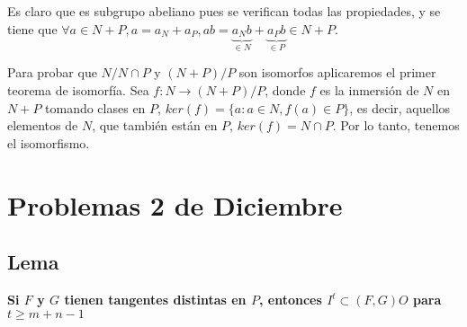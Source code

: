 Es claro que es subgrupo abeliano pues se verifican todas las propiedades, y se tiene que $\forall a \in N+P, a=a_N+a_P, ab = \underbrace{a_Nb}_{\in N}+\underbrace{a_Pb}_{\in P} \in N+P$.

Para probar que $N/N\cap P$ y $(N+P)/P$ son isomorfos aplicaremos el primer teorema de isomorfía.
Sea $f:N \rightarrow (N+P)/P$, donde $f$ es la inmersión de $N$ en $N+P$ tomando clases en $P$, $ker(f)= \{a : a \in N, f(a) \in P \}$, es decir, aquellos elementos de $N$, que también están en $P$, $ker(f)=N\cap P$. Por lo tanto, tenemos el isomorfismo.

\newpage

\section{Problemas 2 de Diciembre}

\subsection{Lema}

\textbf{Si $F$ y $G$ tienen tangentes distintas en $P$, entonces $I^t\subset (F,G)O$ para $t\ge m+n-1$}

